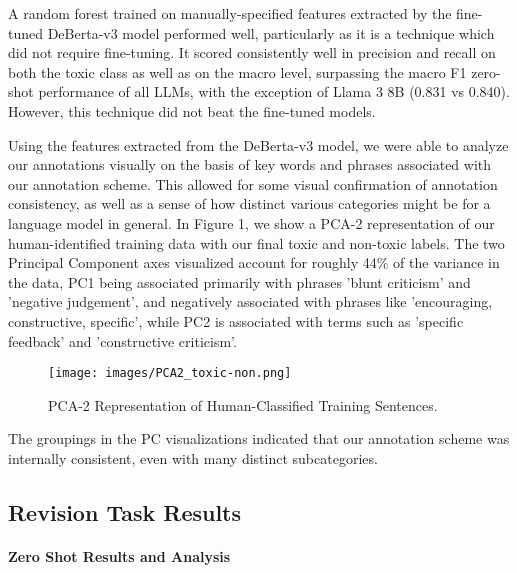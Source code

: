 A random forest trained on manually-specified features extracted by the fine-tuned DeBerta-v3 model performed well, particularly as it is a technique which did not require fine-tuning. It scored consistently well in precision and recall on both the toxic class as well as on the macro level, surpassing the macro F1 zero-shot performance of all LLMs, with the exception of Llama 3 8B (0.831 vs 0.840). However, this technique did not beat the fine-tuned models.

Using the features extracted from the DeBerta-v3 model, we were able to analyze our annotations visually on the basis of key words and phrases associated with our annotation scheme. This allowed for some visual confirmation of annotation consistency, as well as a sense of how distinct various categories might be for a language model in general. In Figure 1, we show a PCA-2 representation of our human-identified training data with our final toxic and non-toxic labels. The two Principal Component axes visualized account for roughly 44\% of the variance in the data, PC1 being associated primarily with phrases 'blunt criticism' and 'negative judgement', and negatively associated with phrases like 'encouraging, constructive, specific', while PC2 is associated with terms such as 'specific feedback' and 'constructive criticism'.
\begin{figure}[ht]
    \centering
    \texttt{[image: images/PCA2\_toxic-non.png]}
    \caption{PCA-2 Representation of Human-Classified Training Sentences.}
    \label{fig:PCA2 - toxic vs not}
\end{figure}


The groupings in the PC visualizations indicated that our annotation scheme was internally consistent, even with many distinct subcategories. 

\subsection{Revision Task Results}

\paragraph{Zero Shot Results and Analysis}


